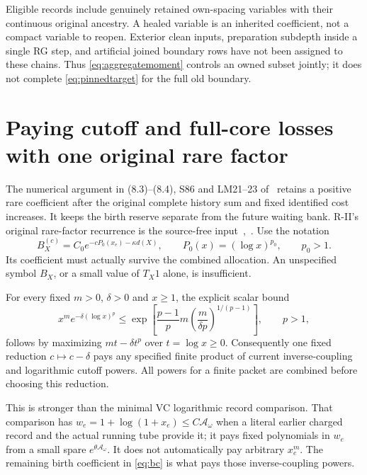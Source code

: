 \documentclass[11pt,letterpaper]{article}
\numberwithin{equation}{section}
\theoremstyle{plain}
\theoremstyle{remark}\newtheorem{remark}[theorem]{Scope}
\begin{document}
Eligible records include genuinely retained own-spacing variables with
their continuous original ancestry. A healed variable is an inherited
coefficient, not a compact variable to reopen. Exterior clean inputs,
preparation subdepth inside a single RG step, and artificial joined
boundary rows have not been assigned to these chains. Thus
\eqref{eq:aggregatemoment} controls an owned subset jointly; it does not
complete \eqref{eq:pinnedtarget} for the full old boundary.

\section{Paying cutoff and full-core losses with one original rare factor}

The numerical argument in (8.3)--(8.4), S86 and LM21--23 of~\cite[pp.~137--138, 614, 774]{W} retains a
positive rare coefficient after the original complete history sum and
fixed identified cost increases. It keeps the birth reserve separate from
the future waiting bank. R-II's original rare-factor recurrence is the
source-free input~\cite[pp.~137--138]{W},~\cite{rii}. Use the notation
\begin{equation}
 B_X^{(c)}=C_0e^{-cP_0(x_e)-\kappa d(X)},\qquad
 P_0(x)=(\log x)^{p_0},\qquad p_0>1.
 \label{eq:bc}
\end{equation}
Its coefficient must actually survive the combined allocation. An
unspecified symbol $B_X$, or a small value of $T_X1$ alone, is insufficient.

For every fixed $m>0$, $\delta>0$ and $x\ge1$, the explicit scalar bound
\begin{equation}
 x^m e^{-\delta(\log x)^p}
 \le \exp\left[
 \frac{p-1}{p}m\left(\frac{m}{\delta p}\right)^{1/(p-1)}
 \right],\qquad p>1,
 \label{eq:rarepower}
\end{equation}
follows by maximizing $mt-\delta t^p$ over $t=\log x\ge0$.
Consequently one fixed reduction $c\mapsto c-\delta$ pays any specified
finite product of current inverse-coupling and logarithmic cutoff powers.
All powers for a finite packet are combined before choosing this reduction.

This is stronger than the minimal VC logarithmic record comparison.
That comparison has $w_e=1+\log(1+x_e)\le C\mathcal A_\omega$ when a
literal earlier charged record and the actual running tube provide it;
it pays fixed polynomials in $w_e$ from a small spare
$e^{\theta\mathcal A_\omega}$. It does not automatically pay arbitrary
$x_e^m$. The remaining birth coefficient in \eqref{eq:bc} is what pays
those inverse-coupling powers.
\end{document}
